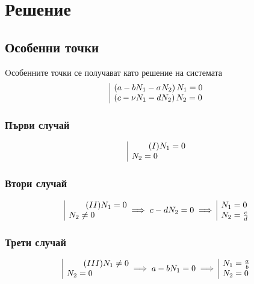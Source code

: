 \documentclass[a4paper,fleqn,12pt]{article}
\begin{document}
\newpage
\section{Решение}
\subsection{Особенни точки}
Oсобенните точки се получават като решение на системата
\begin{gather*}
		\begin{array}{|l@{}}
		\left(a - bN_1 - \sigma N_2 \right) N_1 = 0\\
		\left(c - \nu N_1 - d N_2 \right) N_2 = 0 \\
		\end{array}
\end{gather*}

\subsubsection{Първи случай}
\begin{gather*}
	\begin{array}{|l@{}}\tag{$I$}
		 N_1 = 0\\
		 N_2 = 0
	\end{array}
\end{gather*}
\subsubsection{Втори случай}
\begin{gather*}
	\begin{array}{|l@{}}\tag{$II$}
		 N_1 = 0\\
		 N_2 \neq 0
	\end{array} \implies c - dN_2 = 0 \implies 
	\begin{array}{|l@{}}
		 N_1 = 0\\
		 N_2 = \frac{c}{d}
	\end{array}
\end{gather*}
\subsubsection{Трети случай}
\begin{gather*}
	\begin{array}{|l@{}}\tag{$III$}
		 N_1 \neq 0\\
		 N_2 = 0
	\end{array} \implies a- bN_1 = 0 \implies 
	\begin{array}{|l@{}}
		 N_1 = \frac{a}{b}\\
		 N_2 = 0
	\end{array} 
\end{gather*}
\end{document}
